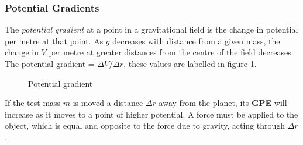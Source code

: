\documentclass[12pt]{article}
\begin{document}
\subsubsection{Potential Gradients}
\label{sec:orge58bd12}

The \emph{potential gradient} at a point in a gravitational field is the change in potential per metre at that point. As \(g\) decreases with distance from a given mass, the change in \(V\) per metre at greater distances from the centre of the field decreases. The potential gradient = \(\Delta V / \Delta r\), these values are labelled in figure \ref{img:potential_step}.

\begin{figure}[H]
\centering
{}
\caption{Potential gradient}
\label{img:potential_step}
\end{figure}

If the test mass \(m\) is moved a distance \(\Delta r\) away from the planet, its \textbf{GPE} will increase as it moves to a point of higher potential. A force must be applied to the object, which is equal and opposite to the force due to gravity, acting through \(\Delta r\).
\end{document}
